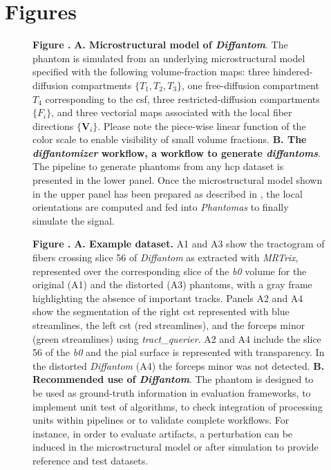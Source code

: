 \documentclass[english]{frontiers/frontiersSCNS} %
\providecommand{\diffantom}{\emph{Diffantom}}
\newcommand{\lowb}{\textit{b0}}
\begin{document}
\newpage
\section*{Figures}

\begin{figure}[h!]
\begin{center}

\end{center}
\textbf{\label{fig:diffantom-01} Figure . }{%
\textbf{A. Microstructural model of \diffantom{}}.
The phantom is simulated from an underlying microstructural model specified with the
  following volume-fraction maps: three hindered-diffusion compartments $\{T_1, T_2, T_3\}$,
  one free-diffusion compartment $T_4$ corresponding to the \gls*{csf},
  three restricted-diffusion compartments $\{F_i\}$, and three vectorial maps
  associated with the local fiber directions $\{\mathbf{V}_i\}$.
Please note the piece-wise linear function of the color scale to enable visibility of small volume fractions.
\textbf{B. The \emph{diffantomizer} workflow, a workflow to generate \emph{diffantoms}}.
The pipeline to generate phantoms from any \gls*{hcp} dataset is presented in the lower panel.
Once the microstructural model shown in the upper panel has been prepared as described in ,
  the local orientations are computed and fed into \emph{Phantomas} to finally simulate the signal.
}
\end{figure}

\begin{figure}[h!]
\begin{center}

\end{center}
\textbf{\label{fig:diffantom-02} Figure . }{%
\textbf{A. Example dataset.}
A1 and A3 show the tractogram of fibers crossing slice 56 of \diffantom{} as
  extracted with \emph{MRTrix}, represented over the corresponding slice of the
  \lowb{} volume for the original (A1) and the distorted (A3) phantoms, with a gray
  frame highlighting the absence of important tracks.
Panels A2 and A4 show the segmentation of the right \gls*{cst} represented with blue
  streamlines, the left \gls*{cst} (red streamlines), and the forceps minor (green streamlines)
  using \emph{tract\_querier}.
A2 and A4 include the slice 56 of the \lowb{} and the pial surface is represented
  with transparency.
In the distorted \diffantom{} (A4) the forceps minor was not detected.
\textbf{B. Recommended use of \diffantom{}}.
The phantom is designed to be used as ground-truth information in evaluation frameworks,
  to implement unit test of algorithms, to check integration of processing units within
  pipelines or to validate complete workflows.
For instance, in order to evaluate artifacts, a perturbation can be induced in the microstructural
  model or after simulation to provide reference and test datasets.
}
\end{figure}
\end{document}
